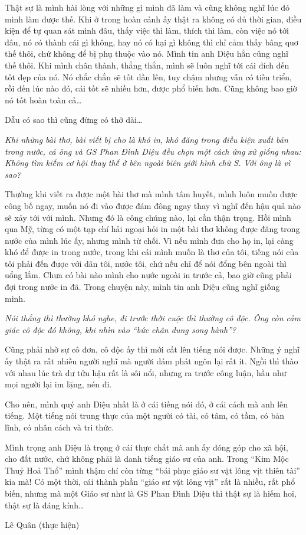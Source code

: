 Thật sự là mình hài lòng với những gì mình đã làm và cũng không nghĩ lúc đó mình làm được thế. Khi ở trong hoàn cảnh ấy thật ra không có đủ thời gian, điều kiện để tự quan sát mình đâu, thấy việc thì làm, thích thì làm, còn việc nó tới đâu, nó có thành cái gì không, hay nó có hại gì không thì chỉ cảm thấy bâng quơ thế thôi, chứ không để bị phụ thuộc vào nó. Mình tin anh Diệu hẳn cũng nghĩ thế thôi. Khi mình chân thành, thẳng thắn, mình sẽ luôn nghĩ tới cái đích đến tốt đẹp của nó. Nó chắc chắn sẽ tốt dần lên, tuy chậm nhưng vẫn có tiến triển, rồi đến lúc nào đó, cái tốt sẽ nhiều hơn, được phổ biến hơn. Cũng không bao giờ nó tốt hoàn toàn cả…

Dẫu có sao thì cũng đừng có thở dài…

\emph{Khi những bài thơ, bài viết bị cho là khó in, khó đăng trong điều kiện xuất bản trong nước, cả ông và GS Phan Đình Diệu đều chọn một cách ứng xử giống nhau: Không tìm kiếm cơ hội thay thế ở bên ngoài biên giới hình chữ S. Với ông là vì sao?}

Thường khi viết ra được một bài thơ mà mình tâm huyết, mình luôn muốn được công bố ngay, muốn nó đi vào được đám đông ngay thay vì nghĩ đến hậu quả nào sẽ xảy tới với mình. Nhưng đó là công chúng nào, lại cần thận trọng. Hồi mình qua Mỹ, từng có một tạp chí hải ngoại hỏi in một bài thơ không được đăng trong nước của mình lúc ấy, nhưng mình từ chối. Vì nếu mình đưa cho họ in, lại càng khó để được in trong nước, trong khi cái mình muốn là thơ của tôi, tiếng nói của tôi phải đến được với dân tôi, nước tôi, chứ nếu chỉ để nói đổng bên ngoài thì uổng lắm. Chưa có bài nào mình cho nước ngoài in trước cả, bao giờ cũng phải đợi trong nước in đã. Trong chuyện này, mình tin anh Diệu cũng nghĩ giống mình.

\emph{Nói thẳng thì thường khó nghe, đi trước thời cuộc thì thường cô độc. Ông còn cảm giác cô độc đó không, khi nhìn vào “bức chân dung song hành”?}

Cũng phải nhờ sự cô đơn, cô độc ấy thì mới cất lên tiếng nói được. Những ý nghĩ ấy thật ra rất nhiều người nghĩ mà người dám phát ngôn lại rất ít. Ngồi thì thào với nhau lúc trà dư tửu hậu rất là sôi nổi, nhưng ra trước công luận, hầu như mọi người lại im lặng, nén đi.

Cho nên, mình quý anh Diệu nhất là ở cái tiếng nói đó, ở cái cách mà anh lên tiếng. Một tiếng nói trung thực của một người có tài, có tâm, có tầm, có bản lĩnh, có nhân cách và tri thức.

Mình trọng anh Diệu là trọng ở cái thực chất mà anh ấy đóng góp cho xã hội, cho đất nước, chứ không phải là danh tiếng giáo sư của anh. Trong “Kim Mộc Thuỷ Hoả Thổ” mình thậm chí còn từng “bái phục giáo sư vặt lông vịt thiên tài” kia mà! Có một thời, cái thành phần “giáo sư vặt lông vịt” rất là nhiều, rất phổ biến, nhưng mà một Giáo sư như là GS Phan Đình Diệu thì thật sự là hiếm hoi, thật sự là đáng kính…

Lê Quân (thực hiện)
